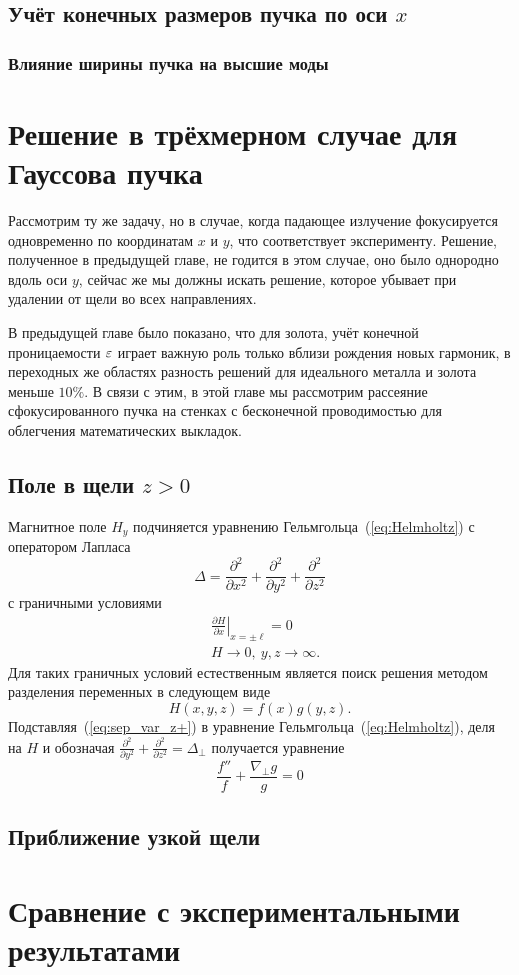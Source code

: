 \section{Учёт конечных размеров пучка по оси $x$}
\subsection{Влияние ширины пучка на высшие моды}

\chapter{Решение в трёхмерном случае для Гауссова пучка}
Рассмотрим ту же задачу, но в случае, когда падающее излучение фокусируется одновременно по координатам $x$ и $y$, что соответствует эксперименту. Решение, полученное в предыдущей главе, не годится в этом случае, оно было однородно вдоль оси $y$, сейчас же мы должны искать решение, которое убывает при удалении от щели во всех направлениях. 

В предыдущей главе было показано, что для золота, учёт конечной проницаемости $\varepsilon$ играет важную роль только вблизи рождения новых гармоник, в переходных же областях разность решений для идеального металла и золота меньше $10\%$. В связи с этим, в этой главе мы рассмотрим рассеяние сфокусированного пучка на стенках с бесконечной проводимостью для облегчения математических выкладок.

\section{Поле в щели $z > 0$}
Магнитное поле $H_y$ подчиняется уравнению Гельмгольца~(\ref{eq:Helmholtz}) с оператором Лапласа 
$$
\Delta = \frac{\partial^2}{\partial x^2} + \frac{\partial^2}{\partial y^2} + \frac{\partial^2}{\partial z^2}
$$
с граничными условиями 
\begin{align}
    &\left.\frac{\partial H}{\partial x}\right|_{x = \pm \ell} = 0\\
    &H \to 0, \ y,z\to \infty.
\end{align}
Для таких граничных условий естественным является поиск решения методом разделения переменных в следующем виде
\begin{equation}
H(x,y,z) = f(x) g(y,z).
\label{eq:sep_var_z+}
\end{equation}
Подставляя~(\ref{eq:sep_var_z+}) в уравнение Гельмгольца~(\ref{eq:Helmholtz}), деля на $H$ и обозначая $ \frac{\partial^2}{\partial y^2} + \frac{\partial^2}{\partial z^2} = \Delta_\perp$ получается уравнение
\begin{equation}
    \frac{f''}{f} + \frac{\nabla_\perp g}{g} = 0
\end{equation}
\section{Приближение узкой щели}

\chapter{Сравнение с экспериментальными результатами}

